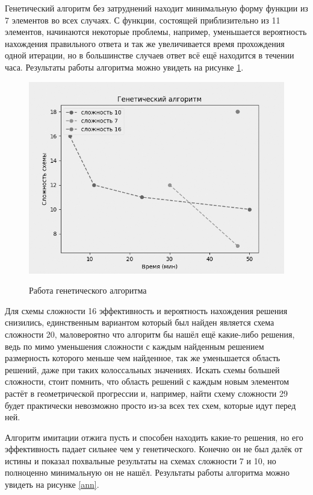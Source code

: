 \documentclass[14pt]{extarticle} %
\begin{document}
Генетический алгоритм без затруднений находит минимальную форму функции из 7 элементов во всех случаях. С функции, состоящей приблизительно из 11 элементов, начинаются некоторые проблемы, например, уменьшается вероятность нахождения правильного ответа и так же увеличивается время прохождения одной итерации, но в большинстве случаев ответ всё ещё находится в течении часа. Результаты работы алгоритма можно увидеть на рисунке \ref{gen}.
\begin{figure}[h]
	\centering
	\caption{Работа генетического алгоритма}
	\includegraphics[scale=0.7]{img/figure_1.png}
	\label{gen}
\end{figure}





Для схемы сложности 16 эффективность и вероятность нахождения решения снизились, единственным вариантом который был найден является схема сложности 20, маловероятно что алгоритм бы нашёл ещё какие-либо решения, ведь по мимо уменьшения сложности с каждым найденным решением размерность которого меньше чем найденное, так же уменьшается область решений, даже при таких колоссальных значениях. Искать схемы большей сложности, стоит помнить, что область решений с каждым новым элементом растёт в геометрической прогрессии и, например, найти схему сложности 29 будет практически невозможно просто из-за всех тех схем, которые идут перед ней.

Алгоритм имитации отжига пусть и способен находить какие-то решения, но его эффективность падает сильнее чем у генетического. Конечно он не был далёк от истины и показал похвальные результаты на схемах сложности 7 и 10, но полноценно минимальную он не нашёл. Результаты работы алгоритма можно увидеть на рисунке \ref{ann}.
\end{document}
